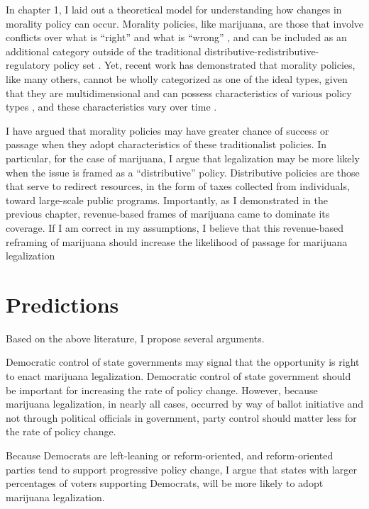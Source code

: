 In chapter 1, I laid out a theoretical model for understanding how changes in morality policy can occur. Morality policies, like marijuana, are those that involve conflicts over what is ``right'' and what is ``wrong'' \citep{mooney_1999}, and can be included as an additional category outside of the traditional distributive-redistributive-regulatory policy set \citep{lowi_1964}. Yet, recent work has demonstrated that morality policies, like many others, cannot be wholly categorized as one of the ideal types, given that they are multidimensional and can possess characteristics of various policy types \citep{meier_2001,spitzer_1995}, and these characteristics vary over time \citep{greenberg_et_al_1977,roh_and_berry_2008,spitzer_1987,steinberger_1980}. 

I have argued that morality policies may have greater chance of success or passage when they adopt characteristics of these traditionalist policies. In particular, for the case of marijuana, I argue that legalization may be more likely when the issue is framed as a ``distributive'' policy. Distributive policies are those that serve to redirect resources, in the form of taxes collected from individuals, toward large-scale public programs. Importantly, as I demonstrated in the previous chapter, revenue-based frames of marijuana came to dominate its coverage. If I am correct in my assumptions, I believe that this revenue-based reframing of marijuana should increase the likelihood of passage for marijuana legalization








\section{Predictions}

Based on the above literature, I propose several arguments. 

Democratic control of state governments may signal that the opportunity is right to enact marijuana legalization. Democratic control of state government should be important for increasing the rate of policy change. However, because marijuana legalization, in nearly all cases, occurred by way of ballot initiative and not through political officials in government, party control should matter less for the rate of policy change. 

Because Democrats are left-leaning or reform-oriented, and reform-oriented parties tend to support progressive policy change, I argue that states with larger percentages of voters supporting Democrats, will be more likely to adopt marijuana legalization.

